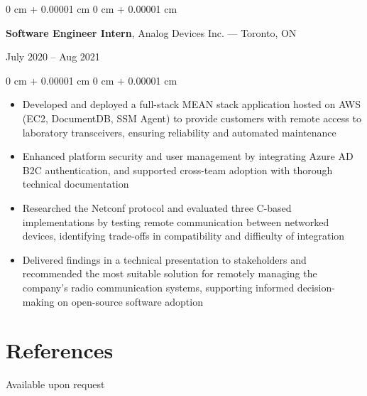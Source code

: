 \documentclass[10pt, letterpaper]{article}
\newenvironment{highlights}{
    \begin{itemize}[
        topsep=0.10 cm,
        parsep=0.10 cm,
        partopsep=0pt,
        itemsep=0pt,
        leftmargin=0 cm + 10pt
    ]
}{
    \end{itemize}
} %
\newenvironment{onecolentry}{
    \begin{adjustwidth}{
        0 cm + 0.00001 cm
    }{
        0 cm + 0.00001 cm
    }
}{
    \end{adjustwidth}
} %
\newenvironment{twocolentry}[2][]{
    \onecolentry
    \def\secondColumn{#2}
    \setcolumnwidth{\fill, 4 cm}
    \begin{paracol}{2}
}{
    \switchcolumn \raggedleft \secondColumn
    \end{paracol}
    \endonecolentry
} %
\begin{document}
        \begin{twocolentry}{July 2020 -- Aug 2021}
            \textbf{Software Engineer Intern}, Analog Devices Inc. --- Toronto, ON
        \end{twocolentry}
        \vspace{0.10 cm}
        \begin{onecolentry}
            \begin{highlights}
                \item Developed and deployed a full-stack MEAN stack application hosted on AWS (EC2, DocumentDB, SSM Agent) to provide customers with remote access to laboratory transceivers, ensuring reliability and automated maintenance
                \item Enhanced platform security and user management by integrating Azure AD B2C authentication, and supported cross-team adoption with thorough technical documentation 
                \item Researched the Netconf protocol and evaluated three C-based implementations by testing remote communication between networked devices, identifying trade-offs in compatibility and difficulty of integration
                \item Delivered findings in a technical presentation to stakeholders and recommended the most suitable solution for remotely managing the company's radio communication systems, supporting informed decision-making on open-source software adoption
            \end{highlights}
        \end{onecolentry}
        
    \section{References}
        Available upon request
\end{document}
